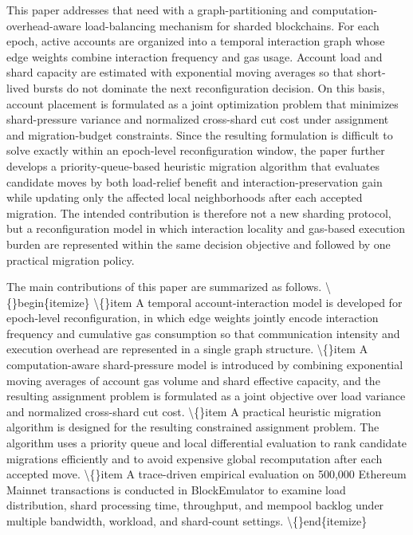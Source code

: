 \documentclass{article}
\begin{document}
This paper addresses that need with a graph-partitioning and computation-overhead-aware load-balancing mechanism for sharded blockchains. For each epoch, active accounts are organized into a temporal interaction graph whose edge weights combine interaction frequency and gas usage. Account load and shard capacity are estimated with exponential moving averages so that short-lived bursts do not dominate the next reconfiguration decision. On this basis, account placement is formulated as a joint optimization problem that minimizes shard-pressure variance and normalized cross-shard cut cost under assignment and migration-budget constraints. Since the resulting formulation is difficult to solve exactly within an epoch-level reconfiguration window, the paper further develops a priority-queue-based heuristic migration algorithm that evaluates candidate moves by both load-relief benefit and interaction-preservation gain while updating only the affected local neighborhoods after each accepted migration. The intended contribution is therefore not a new sharding protocol, but a reconfiguration model in which interaction locality and gas-based execution burden are represented within the same decision objective and followed by one practical migration policy.

The main contributions of this paper are summarized as follows.
\textbackslash\{\}begin\{itemize\}
    \textbackslash\{\}item A temporal account-interaction model is developed for epoch-level reconfiguration, in which edge weights jointly encode interaction frequency and cumulative gas consumption so that communication intensity and execution overhead are represented in a single graph structure.
    \textbackslash\{\}item A computation-aware shard-pressure model is introduced by combining exponential moving averages of account gas volume and shard effective capacity, and the resulting assignment problem is formulated as a joint objective over load variance and normalized cross-shard cut cost.
    \textbackslash\{\}item A practical heuristic migration algorithm is designed for the resulting constrained assignment problem. The algorithm uses a priority queue and local differential evaluation to rank candidate migrations efficiently and to avoid expensive global recomputation after each accepted move.
    \textbackslash\{\}item A trace-driven empirical evaluation on 500,000 Ethereum Mainnet transactions is conducted in BlockEmulator to examine load distribution, shard processing time, throughput, and mempool backlog under multiple bandwidth, workload, and shard-count settings.
\textbackslash\{\}end\{itemize\}
\end{document}

